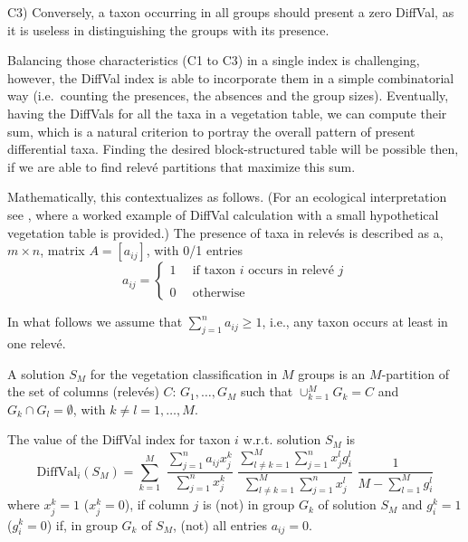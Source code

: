 C3) Conversely, a taxon occurring in all groups should present a zero DiffVal, as it is useless in distinguishing the groups with its presence.

Balancing those characteristics (C1 to C3) in a single index is challenging, however, the DiffVal index is able to incorporate them in a simple combinatorial way (i.e.~counting the presences, the absences and the group sizes).
Eventually, having the DiffVals for all the taxa in a vegetation table, we can compute their sum, which is a natural criterion to portray the overall pattern of present differential taxa. Finding the desired block-structured table will be possible then, if we are able to find relevé partitions that maximize this sum.

Mathematically, this contextualizes as follows. (For an ecological interpretation see \citet{MH2025}, where a worked example of DiffVal calculation with a small hypothetical vegetation table is provided.) The presence of taxa in relevés is described as a, \(m\times n\), matrix \(A=[a_{ij}]\), with 0/1 entries
\begin{equation*}
{a}_{ij}=\left\{\begin{array}{cl}
1  &\mbox{if taxon $i$ occurs in relevé $j$} \\ \quad \\
0  &\mbox{otherwise}     
\end{array}\right.
\end{equation*}

In what follows we assume that \(\sum_{j=1}^n a_{ij}\geq 1\), i.e., any taxon occurs at least in one relevé.

A solution \(S_M\) for the vegetation classification in \(M\) groups is an \(M\)-partition of the set of columns (relevés) \(C\): \(G_1,\dots,G_M\) such that \(\cup_{k=1}^M G_k=C\) and \(G_k\cap G_l=\emptyset\), with \(k\not= l=1,\dots,M\).

The value of the DiffVal index for taxon \(i\) w.r.t. solution \(S_M\) is
\begin{equation}
\displaystyle{
\mathrm{DiffVal}_i(S_M)= {\sum_{k=1}^M} \,\,
\frac{\sum_{j=1}^n a_{ij} x_j^k}{\sum_{j=1}^n x_j^k}
\,\,
\frac{
\sum_{l\not=k=1}^M\sum_{j=1}^n  x_j^l g_i^l}
{\sum_{l\not=k=1}^M\sum_{j=1}^n  x_j^l}
\,\,
\frac{1}{M-\sum_{l=1}^M g_i^l}
}
\label{eq:DiffVal}
\end{equation}
where \(x_j^k=1\) (\(x_j^k=0\)), if column \(j\) is (not) in group \(G_k\) of solution \(S_M\) and \(g_i^k=1\) (\(g_i^k=0\)) if, in group \(G_k\) of \(S_M\), (not) all entries \(a_{ij}=0\).

